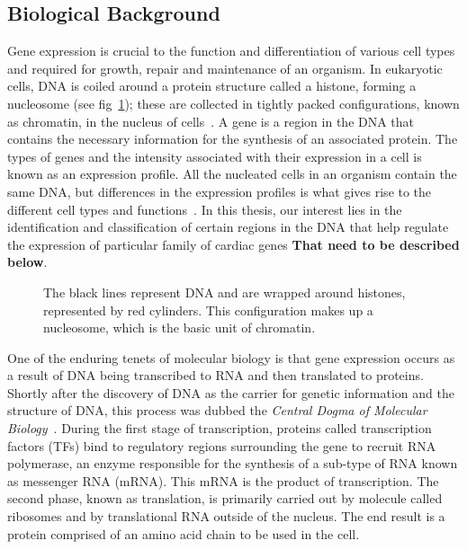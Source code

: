         \subsection{Biological Background}
        Gene expression is crucial to the function and differentiation of various cell types and required for growth, repair and maintenance of an organism.  In eukaryotic cells, DNA is coiled around a protein structure called a histone, forming a nucleosome (see fig~\ref{fig:chromatin1}); these are collected in tightly packed configurations, known as chromatin, in the nucleus of cells~\cite{alberts2002chromosomal, kornberg1974chromatin}. A gene is a region in the DNA that contains the necessary information for the synthesis of an associated protein. The types of genes and the intensity associated with their expression in a cell is known as an expression profile. All the nucleated cells in an organism contain the same DNA, but differences in the expression profiles is what gives rise to the different cell types and functions~\cite{lockhart2000genomics}. In this thesis, our interest lies in the identification and classification of certain regions in the DNA that help regulate the expression of particular family of cardiac genes \textbf{That need to be described below}. 

        
            \begin{figure}[h]
                \centering
                    
                \caption{The black lines represent DNA and are wrapped around histones, represented by red cylinders. This configuration makes up a nucleosome, which is the basic unit of chromatin.}
                \label{fig:chromatin1}
            \end{figure}
            

        
        
        One of the enduring tenets of molecular biology is that gene expression occurs as a result of DNA being transcribed to RNA and then translated to proteins. Shortly after the discovery of DNA as the carrier for genetic information and the structure of DNA, this process was dubbed the \emph{Central Dogma of Molecular Biology}~\cite{crick1958protein, macleod1944studies, watson1953structure}. During the first stage of transcription, proteins called transcription factors (TFs) bind to regulatory regions surrounding the gene to recruit RNA polymerase, an enzyme responsible for the synthesis of a sub-type of RNA known as messenger RNA (mRNA). This mRNA is the product of transcription. The second phase, known as translation, is primarily carried out by molecule called ribosomes and by translational RNA outside of the nucleus. The end result is a protein comprised of an amino acid chain to be used in the cell.
        
